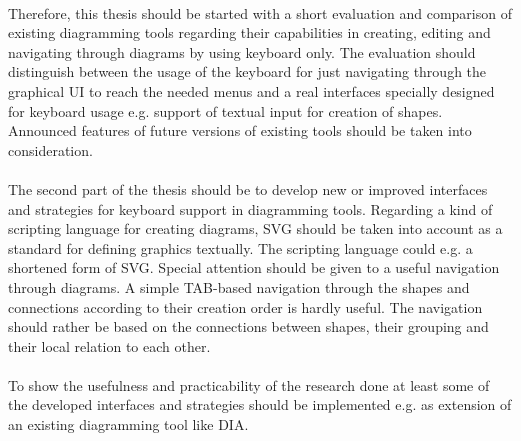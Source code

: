 \paragraph{}
Therefore, this thesis should be started with a short evaluation and comparison of existing diagramming tools regarding their capabilities in creating, editing and navigating through diagrams by using keyboard only. The evaluation should distinguish between the usage of the keyboard for just navigating through the graphical UI to reach the needed menus and a real interfaces specially designed for keyboard usage e.g. support of textual input for creation of shapes. Announced features of future versions of existing tools should be taken into consideration.

\paragraph{}
The second part of the thesis should be to develop new or improved interfaces and strategies for keyboard support in diagramming tools. Regarding a kind of scripting language for creating diagrams, SVG should be taken into account as a standard for defining graphics textually. The scripting language could e.g. a shortened form of SVG. Special attention should be given to a useful navigation through diagrams. A simple TAB-based navigation through the shapes and connections according to their creation order is hardly useful. The navigation should rather be based on the connections between shapes, their grouping and their local relation to each other.

\paragraph{}
To show the usefulness and practicability of the research done at least some of the developed interfaces and strategies should be implemented e.g. as extension of an existing diagramming tool like DIA.
